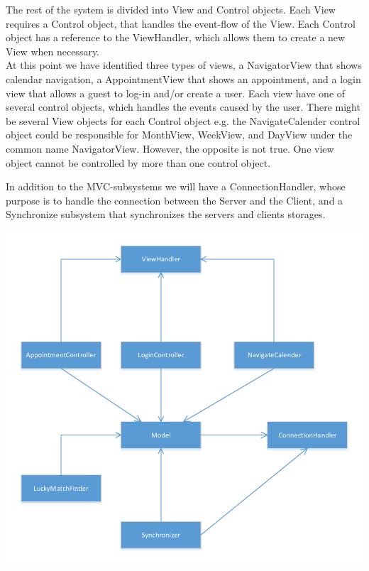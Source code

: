 The rest of the system is divided into View and Control objects. Each View requires a Control object, that handles the event-flow of the View. Each Control object has a reference to the ViewHandler, which allows them to create a new View when necessary. \\

At this point we have identified three types of views, a NavigatorView that shows calendar navigation, a AppointmentView that shows an appointment, and a login view that allows a guest to log-in and/or create a user. Each view have one of several control objects, which handles the events caused by the user. There might be several View objects for each Control object e.g. the NavigateCalender control object could be responsible for MonthView, WeekView, and DayView under the common name NavigatorView. However, the opposite is not true. One view object cannot be controlled by more than one control object. 

In addition to the MVC-subsystems we will have a ConnectionHandler, whose purpose is to handle the connection between the Server and the Client, and a Synchronize subsystem that synchronizes the servers and clients storages.

\begin{center}
\includegraphics[scale=.5]{sections/SubsystemDecomposition.pdf}
\end{center}

